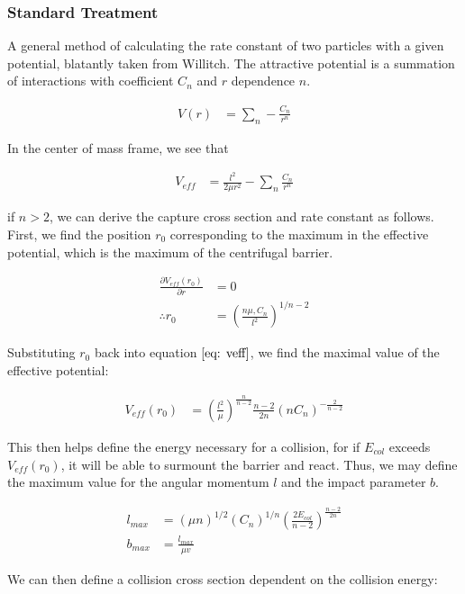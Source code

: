 \documentclass[a4paper]{article}
\begin{document}
\subsubsection{Standard Treatment}
A general method of calculating the rate constant of two particles with a given potential, blatantly taken from Willitch.\cite{Zhang2017} The attractive potential is a summation of interactions with coefficient $C_n$ and $r$ dependence $n$.

\begin{align}
    V(r) & = \sum_n -\frac{C_n}{r^n}
\end{align}

In the center of mass frame, we see that

\begin{align}
    V_{eff} & = \frac{l^2}{2 \mu r^2} - \sum_n \frac{C_n}{r^n}\label{eq: veff}
\end{align}

if $n > 2$, we can derive the capture cross section and rate constant as follows. First, we find the position $r_0$ corresponding to the maximum in the effective potential, which is the maximum of the centrifugal barrier.

\begin{align*}
    \frac{\partial V_{eff}(r_0)}{\partial r} & = 0 \\
    \therefore r_0 & = \left(\frac{n \mu, C_n}{l^2}\right)^{1/n-2}
\end{align*}

Substituting $r_0$ back into equation $\ref{eq: veff}$, we find the maximal value of the effective potential:

\begin{align}
    V_{eff}(r_0) & = \left(\frac{l^2}{\mu}\right)^{\frac{n}{n-2}} \frac{n-2}{2n}(n C_n)^{-\frac{2}{n-2}}
\end{align}

This then helps define the energy necessary for a collision, for if $E_{col}$ exceeds $V_{eff}(r_0)$, it will be able to surmount the barrier and react. Thus, we may define the maximum value for the angular momentum $l$ and the impact parameter $b$.

\begin{align*}
    l_{max} & = (\mu n)^{1/2}(C_n)^{1/n} \left(\frac{2 E_{col}}{n-2}\right)^{\frac{n-2}{2n}} \\
    b_{max} & = \frac{l_{max}}{\mu v}
\end{align*}

We can then define a collision cross section dependent on the collision energy:
\end{document}
